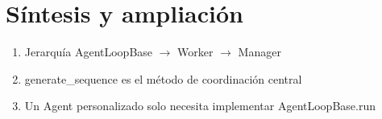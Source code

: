 \section{Síntesis y ampliación}
\begin{enumerate}
  \item Jerarquía AgentLoopBase $\to$ Worker $\to$ Manager
  \item generate\_sequence es el método de coordinación central
  \item Un Agent personalizado solo necesita implementar AgentLoopBase.run
\end{enumerate}

